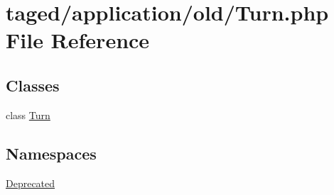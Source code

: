 \hypertarget{_turn_8php}{}\section{taged/application/old/\+Turn.php File Reference}
\label{_turn_8php}
\subsection*{Classes}
\begin{DoxyCompactItemize}
\item 
class \hyperlink{class_turn}{Turn}
\end{DoxyCompactItemize}
\subsection*{Namespaces}
\begin{DoxyCompactItemize}
\item 
 \hyperlink{namespace_deprecated}{Deprecated}
\end{DoxyCompactItemize}
